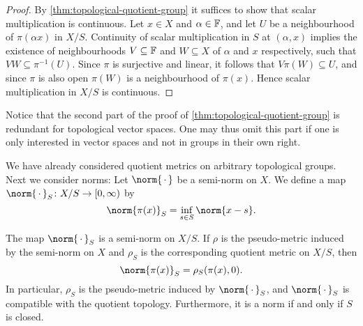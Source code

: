 \documentclass[article, a4paper, 11pt, oneside]{memoir}
\numberwithin{equation}{chapter}
\newcommand{\preim}{^{-1}}
\begin{document}
\begin{proof}
    By \cref{thm:topological-quotient-group} it suffices to show that scalar multiplication is continuous. Let $x \in X$ and $\alpha \in \mathbb{F}$, and let $U$ be a neighbourhood of $\pi(\alpha x)$ in $X/S$. Continuity of scalar multiplication in $S$ at $(\alpha, x)$ implies the existence of neighbourhoods $V \subseteq \mathbb{F}$ and $W \subseteq X$ of $\alpha$ and $x$ respectively, such that $VW \subseteq \pi\preim(U)$. Since $\pi$ is surjective and linear, it follows that $V \pi(W) \subseteq U$, and since $\pi$ is also open $\pi(W)$ is a neighbourhood of $\pi(x)$. Hence scalar multiplication in $X/S$ is continuous.
\end{proof}
%
Notice that the second part of the proof of \cref{thm:topological-quotient-group} is redundant for topological vector spaces. One may thus omit this part if one is only interested in vector spaces and not in groups in their own right.


We have already considered quotient metrics on arbitrary topological groups. Next we consider norms: Let $\norm{\,\cdot\,}$ be a semi-norm on $X$. We define a map $\norm{\,\cdot\,}_S \colon X/S \to [0, \infty)$ by
%
\begin{equation*}
    \norm{\pi(x)}_S
        = \inf_{s \in S} \norm{x - s}.
\end{equation*}

\begin{proposition}
    The map $\norm{\,\cdot\,}_S$ is a semi-norm on $X/S$. If $\rho$ is the pseudo-metric induced by the semi-norm on $X$ and $\rho_S$ is the corresponding quotient metric on $X/S$, then
    \begin{equation*}
        \norm{\pi(x)}_S = \rho_S(\pi(x), 0).
    \end{equation*}
    In particular, $\rho_S$ is the pseudo-metric induced by $\norm{\,\cdot\,}_S$, and $\norm{\,\cdot\,}_S$ is compatible with the quotient topology. Furthermore, it is a norm if and only if $S$ is closed.
\end{proposition}
\end{document}
